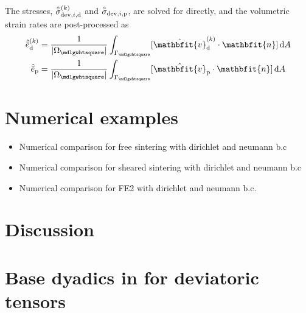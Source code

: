 \documentclass[12pt,a4paper,fleqn]{article}
\renewcommand{\ta}[1]{\mathbfit{#1}}
\renewcommand{\Box}{\mdlgwhtsquare}
\newcommand{\ded}{\mathrm{d}}
\newcommand{\dep}{\mathrm{p}}
\newcommand{\volume}{\frac{1}{|\Omega_\Box|}}
\begin{document}
The stresses, $\hat{\bar{\sigma}}_{\dev,i,\ded}^{(k)}$ and $\hat{\bar{\sigma}}_{\dev,i,\dep}$, are solved for directly, and the volumetric strain rates are post-processed as
\begin{align}
 \hat{\bar{e}}_{\ded}^{(k)} &= \volume\int_{\Gamma_\Box} [\hat{\ta v}_{\ded}^{(k)} \cdot \ta n]\dif A\\
 \hat{\bar{e}}_\dep &= \volume\int_{\Gamma_\Box} [\hat{\ta v}_\dep \cdot \ta n]\dif A 
\end{align}


\section{Numerical examples}
\begin{itemize}
 \item Numerical comparison for free sintering with dirichlet and neumann b.c
 \item Numerical comparison for sheared sintering with dirichlet and neumann b.c
 \item Numerical comparison for FE2 with dirichlet and neumann b.c.
\end{itemize}


\section{Discussion}

\appendix
\section{Base dyadics in for deviatoric tensors}
\label{sec:base_dyads}
\end{document}
